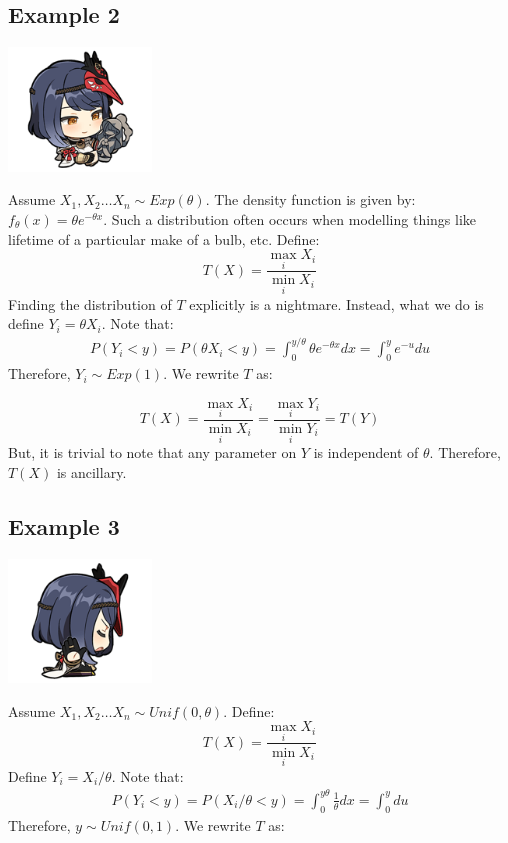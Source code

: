 \documentclass[oneside]{book}
\begin{document}
\subsection{Example 2}
\begin{marginfigure}%
    \includegraphics[width=1.5in]{chibis/file_010.png}
\end{marginfigure}%
Assume $X_1,X_2\hdots X_n\sim Exp(\theta)$. The density function is given by: $f_\theta(x)=\theta e^{-\theta x}$. Such a distribution often occurs when modelling things like lifetime of a particular make of a bulb, etc. Define:
$$T(X)=\frac{\max_i X_i}{\min_i X_i}$$
Finding the distribution of $T$ explicitly is a nightmare. Instead, what we do is define $Y_i=\theta X_i$. Note that:
\begin{align*}
    P(Y_i<y)=P(\theta X_i<y)=\int_0^{y/\theta}\theta e^{-\theta x}dx=\int_0^ye^{-u}du
\end{align*}
Therefore, $Y_i\sim Exp(1)$. We rewrite $T$ as:

$$T(X)=\frac{\max_i X_i}{\min_i X_i}=\frac{\max_i Y_i}{\min_i Y_i}=T(Y)$$
But, it is trivial to note that any parameter on $Y$ is independent of $\theta$. Therefore, $T(X)$ is ancillary. 

\subsection{Example 3}
\begin{marginfigure}%
    \includegraphics[width=1.5in]{chibis/file_011.png}
\end{marginfigure}%
Assume $X_1,X_2\hdots X_n\sim Unif(0,\theta)$. Define:
$$T(X)=\frac{\max_i X_i}{\min_i X_i}$$
Define $Y_i=X_i/\theta$. Note that:
\begin{align*}
    P(Y_i<y)=P(X_i/\theta <y)=\int_0^{y\theta}\frac{1}{\theta}dx=\int_0^y du
\end{align*}
Therefore, $y\sim Unif(0,1)$. We rewrite $T$ as:
\end{document}

